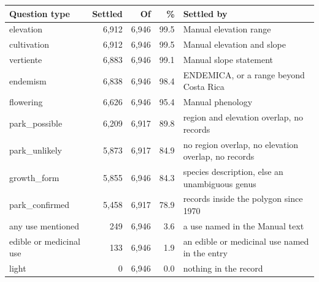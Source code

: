 \begin{tabular}{lrrrl}
\toprule
Question type & Settled & Of & \% & Settled by \\
\midrule
elevation & 6{,}912 & 6{,}946 & 99.5 & Manual elevation range \\
cultivation & 6{,}912 & 6{,}946 & 99.5 & Manual elevation and slope \\
vertiente & 6{,}883 & 6{,}946 & 99.1 & Manual slope statement \\
endemism & 6{,}838 & 6{,}946 & 98.4 & ENDEMICA, or a range beyond Costa Rica \\
flowering & 6{,}626 & 6{,}946 & 95.4 & Manual phenology \\
park\_possible & 6{,}209 & 6{,}917 & 89.8 & region and elevation overlap, no records \\
park\_unlikely & 5{,}873 & 6{,}917 & 84.9 & no region overlap, no elevation overlap, no records \\
growth\_form & 5{,}855 & 6{,}946 & 84.3 & species description, else an unambiguous genus \\
park\_confirmed & 5{,}458 & 6{,}917 & 78.9 & records inside the polygon since 1970 \\
any use mentioned & 249 & 6{,}946 & 3.6 & a use named in the Manual text \\
edible or medicinal use & 133 & 6{,}946 & 1.9 & an edible or medicinal use named in the entry \\
light & 0 & 6{,}946 & 0.0 & nothing in the record \\
\bottomrule
\end{tabular}

